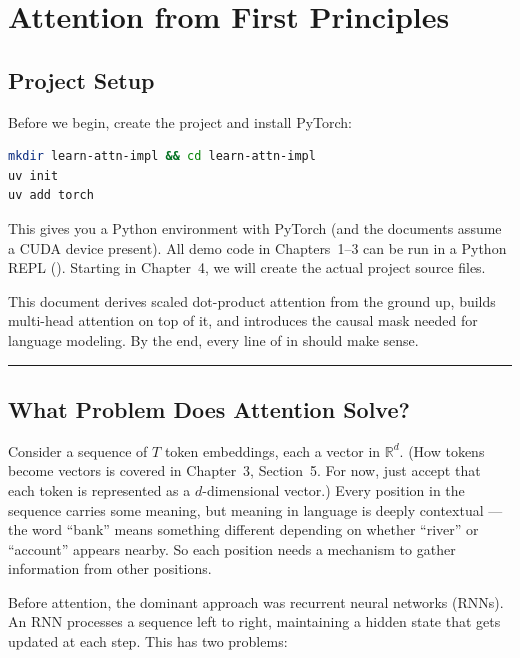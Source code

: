 \chapter{Attention from First Principles}

\section{Project Setup}

Before we begin, create the project and install PyTorch:

\shelltag
\begin{lstlisting}[language=bash]
mkdir learn-attn-impl && cd learn-attn-impl
uv init
uv add torch
\end{lstlisting}

This gives you a Python environment with PyTorch (and the documents assume a CUDA device present). All demo code in Chapters~1--3 can be run in a Python REPL (). Starting in Chapter~4, we will create the actual project source files.


This document derives scaled dot-product attention from the ground up, builds multi-head attention on top of it, and introduces the causal mask needed for language modeling. By the end, every line of  in  should make sense.

\bigskip\hrule\bigskip

\section{What Problem Does Attention Solve?}

Consider a sequence of $T$ token embeddings, each a vector in $\mathbb{R}^d$. (How tokens become vectors is covered in Chapter~3, Section~5. For now, just accept that each token is represented as a $d$-dimensional vector.) Every position in the sequence carries some meaning, but meaning in language is deeply contextual --- the word ``bank'' means something different depending on whether ``river'' or ``account'' appears nearby. So each position needs a mechanism to gather information from other positions.

Before attention, the dominant approach was recurrent neural networks (RNNs). An RNN processes a sequence left to right, maintaining a hidden state that gets updated at each step. This has two problems:

